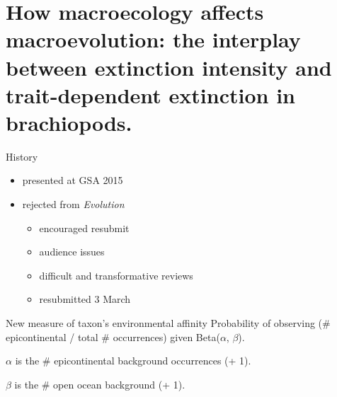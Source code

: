 \documentclass{beamer}
\title{}
\author{}
\institute{}
\date{}
\begin{document}
\begin{frame}
  \tableofcontents
\end{frame}


\section{How macroecology affects macroevolution: the interplay between extinction intensity and trait-dependent extinction in brachiopods.}

\begin{frame}
  \begin{block}{History}
    \begin{itemize}
      \item presented at GSA 2015
      \item rejected from \textit{Evolution}
        \begin{itemize}
          \item encouraged resubmit
          \item audience issues
          \item difficult and transformative reviews
          \item resubmitted 3 March
        \end{itemize}
    \end{itemize}
  \end{block}
\end{frame}

\begin{frame}
  \begin{block}{New measure of taxon's environmental affinity}
    Probability of observing (\# epicontinental / total \# occurrences) given Beta(\(\alpha\), \(\beta\)).
    
    \(\alpha\) is the \# epicontinental background occurrences (+ 1).
    
    \(\beta\) is the \# open ocean background (+ 1).
  \end{block}
\end{frame}
\end{document}
